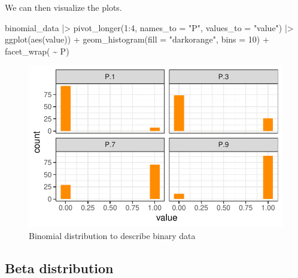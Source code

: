 \documentclass[
  letterpaper,
  DIV=11,
  numbers=noendperiod]{scrreprt}
\newenvironment{Shaded}{\begin{snugshade}}{\end{snugshade}}
\newcommand{\AttributeTok}[1]{\textcolor[rgb]{0.40,0.45,0.13}{#1}}
\newcommand{\DecValTok}[1]{\textcolor[rgb]{0.68,0.00,0.00}{#1}}
\newcommand{\FunctionTok}[1]{\textcolor[rgb]{0.28,0.35,0.67}{#1}}
\newcommand{\NormalTok}[1]{\textcolor[rgb]{0.00,0.23,0.31}{#1}}
\newcommand{\SpecialCharTok}[1]{\textcolor[rgb]{0.37,0.37,0.37}{#1}}
\newcommand{\StringTok}[1]{\textcolor[rgb]{0.13,0.47,0.30}{#1}}
\begin{document}
We can then visualize the plots.

\begin{Shaded}
\begin{Highlighting}[]
\NormalTok{binomial\_data }\SpecialCharTok{|\textgreater{}}
  \FunctionTok{pivot\_longer}\NormalTok{(}\DecValTok{1}\SpecialCharTok{:}\DecValTok{4}\NormalTok{, }\AttributeTok{names\_to =} \StringTok{"P"}\NormalTok{,}
               \AttributeTok{values\_to =} \StringTok{"value"}\NormalTok{) }\SpecialCharTok{|\textgreater{}}
  \FunctionTok{ggplot}\NormalTok{(}\FunctionTok{aes}\NormalTok{(value)) }\SpecialCharTok{+}
  \FunctionTok{geom\_histogram}\NormalTok{(}\AttributeTok{fill =} \StringTok{"darkorange"}\NormalTok{,}
                 \AttributeTok{bins =} \DecValTok{10}\NormalTok{) }\SpecialCharTok{+}
  \FunctionTok{facet\_wrap}\NormalTok{( }\SpecialCharTok{\textasciitilde{}}\NormalTok{ P) }
\end{Highlighting}
\end{Shaded}

\begin{figure}[H]

{\centering \includegraphics{./data-type-distributions_files/figure-pdf/fig-binomial-1.pdf}

}

\caption{\label{fig-binomial}Binomial distribution to describe binary
data}

\end{figure}

\hypertarget{beta-distribution}{%
\subsection{Beta distribution}\label{beta-distribution}}
\end{document}
